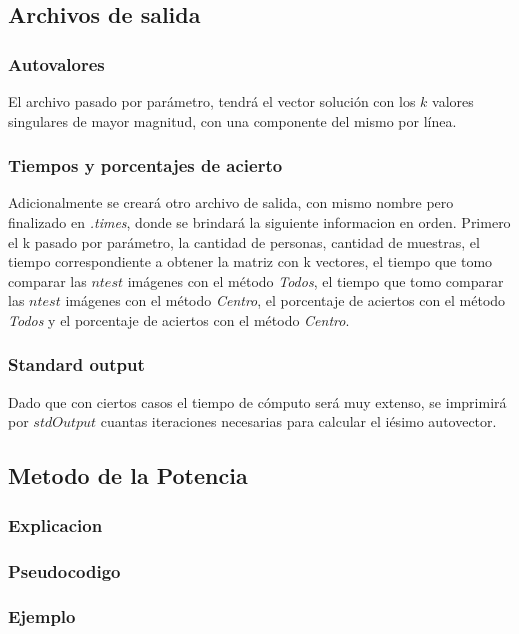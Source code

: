 \subsection{Archivos de salida}
\subsubsection{Autovalores}
El archivo pasado por par\'ametro, tendr\'a el vector soluci\'on con los $k$ valores singulares de mayor magnitud, con una
componente del mismo por l\'inea.

\subsubsection{Tiempos y porcentajes de acierto}
Adicionalmente se crear\'a otro archivo de salida, con mismo nombre pero finalizado en \emph{.times}, donde se brindar\'a la siguiente informacion en orden. Primero el k pasado por par\'ametro, la cantidad de personas, cantidad de muestras, el tiempo correspondiente a obtener la matriz con k vectores, el tiempo que tomo comparar las $ntest$ im\'agenes con el m\'etodo \emph{Todos}, el tiempo que tomo comparar las $ntest$ im\'agenes con el m\'etodo \emph{Centro}, el porcentaje de aciertos con el m\'etodo \emph{Todos} y el porcentaje de aciertos con el m\'etodo \emph{Centro}.

\subsubsection{Standard output}
Dado que con ciertos casos el tiempo de c\'omputo ser\'a muy extenso, se imprimir\'a por $stdOutput$ cuantas iteraciones necesarias para calcular el i\'esimo autovector.

\subsection{Metodo de la Potencia}

  \subsubsection{Explicacion}
  
  \subsubsection{Pseudocodigo}
  
  \subsubsection{Ejemplo}
  

